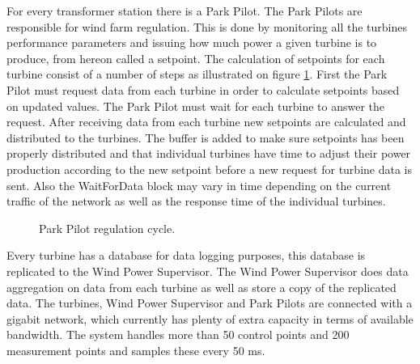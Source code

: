 For every transformer station there is a Park Pilot. The Park Pilots are responsible for wind farm regulation. This is done by monitoring all the turbines performance parameters and issuing how much power a given turbine is to produce, from hereon called a setpoint. The calculation of setpoints for each turbine consist of a number of steps as illustrated on figure \cref{fig:currentSiemensCycleTime}. First the Park Pilot must request data from each turbine in order to calculate setpoints based on updated values. The Park Pilot must wait for each turbine to answer the request. After receiving data from each turbine new setpoints are calculated and distributed to the turbines. The buffer is added to make sure setpoints has been properly distributed and that individual turbines have time to adjust their power production according to the new setpoint before a new request for turbine data is sent. Also the WaitForData block may vary in time depending on the current traffic of the network as well as the response time of the individual turbines.

\begin{figure}[!h]
	\centering
	
	\caption[The current Siemens wind farm system overview]{
		\label{fig:currentSiemensCycleTime} 
		\footnotesize{%
			Park Pilot regulation cycle.
		}
	}
\end{figure}

Every turbine has a database for data logging purposes, this database is replicated to the Wind Power Supervisor.
The Wind Power Supervisor does data aggregation on data from each turbine as well as store a copy of the replicated data.
The turbines, Wind Power Supervisor and Park Pilots are connected with a gigabit network, which currently has plenty of extra capacity in terms of available bandwidth.
The system handles more than 50 control points and 200 measurement points and samples these every 50 ms.

%	
%		
%	
%					
%


